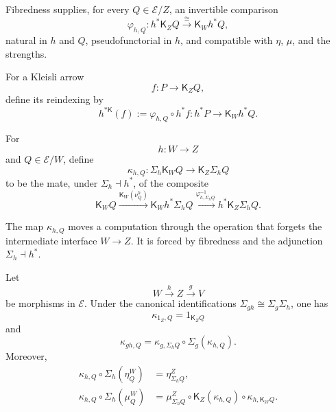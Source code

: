 Fibredness supplies, for every \(Q\in\mathcal E/Z\), an invertible comparison
\[
    \varphi_{h,Q}:
    h^*\mathsf K_ZQ
    \xrightarrow{\cong}
    \mathsf K_Wh^*Q,
\]
natural in \(h\) and \(Q\), pseudofunctorial in \(h\), and compatible with
\(\eta\), \(\mu\), and the strengths.

For a Kleisli arrow
\[
    f:P\longrightarrow\mathsf K_ZQ,
\]
define its reindexing by
\[
    h^{*\mathsf K}(f)
    :=
    \varphi_{h,Q}\circ h^*f:
    h^*P\longrightarrow\mathsf K_Wh^*Q.
\]

\begin{definition}
\label{def:dependent-sum-effect-transport}
For
\[
    h:W\to Z
\]
and \(Q\in\mathcal E/W\), define
\[
    \kappa_{h,Q}:
    \Sigma_h\mathsf K_WQ
    \longrightarrow
    \mathsf K_Z\Sigma_hQ
\]
to be the mate, under \(\Sigma_h\dashv h^*\), of the composite
\[
    \mathsf K_WQ
    \xrightarrow{\mathsf K_W(\nu^h_Q)}
    \mathsf K_Wh^*\Sigma_hQ
    \xrightarrow{\varphi_{h,\Sigma_hQ}^{-1}}
    h^*\mathsf K_Z\Sigma_hQ.
\]
\end{definition}

The map \(\kappa_{h,Q}\) moves a computation through the operation that
forgets the intermediate interface \(W\to Z\).  It is forced by fibredness
and the adjunction \(\Sigma_h\dashv h^*\).

\begin{proposition}
\label{prop:dependent-sum-effect-functoriality}
Let
\[
    W\xrightarrow{h}Z\xrightarrow{g}V
\]
be morphisms in \(\mathcal E\).  Under the canonical identifications
\(\Sigma_{gh}\cong\Sigma_g\Sigma_h\), one has
\[
    \kappa_{1_Z,Q}=1_{\mathsf K_ZQ}
\]
and
\[
    \kappa_{gh,Q}
    =
    \kappa_{g,\Sigma_hQ}
    \circ
    \Sigma_g(\kappa_{h,Q}).
\]
Moreover,
\begin{align}
    \kappa_{h,Q}\circ\Sigma_h(\eta^W_Q)
    &=
    \eta^Z_{\Sigma_hQ},
    \label{eq:kappa-unit}
    \\
    \kappa_{h,Q}\circ\Sigma_h(\mu^W_Q)
    &=
    \mu^Z_{\Sigma_hQ}
    \circ
    \mathsf K_Z(\kappa_{h,Q})
    \circ
    \kappa_{h,\mathsf K_WQ}.
    \label{eq:kappa-multiplication}
\end{align}
\end{proposition}


